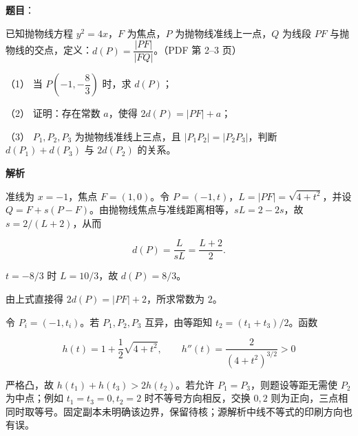 \begin{answer}

\textbf{题目}：

已知抛物线方程 $y^2=4x$，$F$ 为焦点，$P$ 为抛物线准线上一点，$Q$ 为线段 $PF$ 与抛物线的交点，定义：$d(P)=\dfrac{|PF|}{|FQ|}$。（PDF 第 2–3 页）

（1） 当 $P\left(-1,-\dfrac83\right)$ 时，求 $d(P)$；

（2） 证明：存在常数 $a$，使得 $2d(P)=|PF|+a$；

（3） $P_1,P_2,P_3$ 为抛物线准线上三点，且 $|P_1P_2|=|P_2P_3|$，判断 $d(P_1)+d(P_3)$ 与 $2d(P_2)$ 的关系。

\textbf{解析}

准线为 $x=-1$，焦点 $F=(1,0)$。令 $P=(-1,t)$，$L=|PF|=\sqrt{4+t^2}$，并设 $Q=F+s(P-F)$。由抛物线焦点与准线距离相等，$sL=2-2s$，故 $s=2/(L+2)$，从而

\nopagebreak[4]
\[
d(P)=\frac{L}{sL}=\frac{L+2}{2}.
\]


$t=-8/3$ 时 $L=10/3$，故 $d(P)=8/3$。


由上式直接得 $2d(P)=|PF|+2$，所求常数为 $2$。


令 $P_i=(-1,t_i)$。若 $P_1,P_2,P_3$ 互异，由等距知 $t_2=(t_1+t_3)/2$。函数

\nopagebreak[4]
\[
h(t)=1+\frac12\sqrt{4+t^2},\qquad h''(t)=\frac{2}{(4+t^2)^{3/2}}>0
\]

严格凸，故 $h(t_1)+h(t_3)>2h(t_2)$。若允许 $P_1=P_3$，则题设等距无需使 $P_2$ 为中点；例如 $t_1=t_3=0,t_2=2$ 时不等号方向相反，交换 $0,2$ 则为正向，三点相同时取等号。固定副本未明确该边界，保留待核；源解析中线不等式的印刷方向也有误。




\end{answer}
